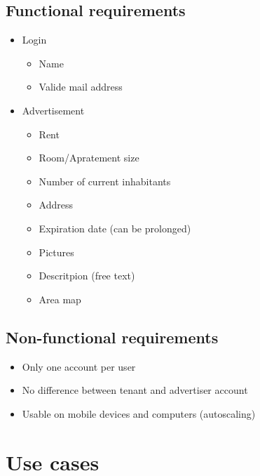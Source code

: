 \documentclass[a4paper,11pt]{article}
\begin{document}
\subsection*{Functional requirements}
\begin{itemize}
  \item Login
  \begin{itemize}
    \item Name
    \item Valide mail address
  \end{itemize}
  \item Advertisement
  \begin{itemize}
    \item Rent
    \item Room/Apratement size
    \item Number of current inhabitants
    \item Address
    \item Expiration date (can be prolonged)
    \item Pictures
    \item Descritpion (free text)
    \item Area map
  \end{itemize}
\end{itemize}
\subsection*{Non-functional requirements}
\begin{itemize}
  \item Only one account per user
  \item No difference between tenant and advertiser account
  \item Usable on mobile devices and computers (autoscaling)
\end{itemize}

\section{Use cases}
\end{document}
